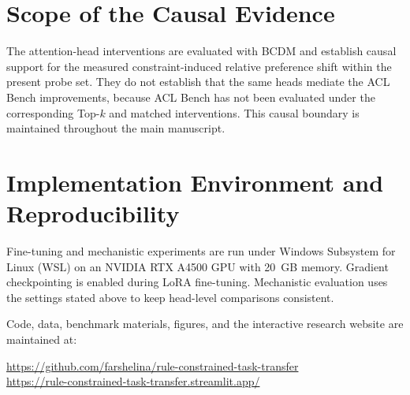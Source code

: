 \documentclass[11pt]{article}
\begin{document}
\section{Scope of the Causal Evidence}

The attention-head interventions are evaluated with BCDM and establish causal support for the measured constraint-induced relative preference shift within the present probe set. They do not establish that the same heads mediate the ACL Bench improvements, because ACL Bench has not been evaluated under the corresponding Top-$k$ and matched interventions. This causal boundary is maintained throughout the main manuscript.

\section{Implementation Environment and Reproducibility}

Fine-tuning and mechanistic experiments are run under Windows Subsystem for Linux (WSL) on an NVIDIA RTX A4500 GPU with 20~GB memory. Gradient checkpointing is enabled during LoRA fine-tuning. Mechanistic evaluation uses the settings stated above to keep head-level comparisons consistent.

Code, data, benchmark materials, figures, and the interactive research website are maintained at:
\begin{center}
\url{https://github.com/farshelina/rule-constrained-task-transfer}\\
\url{https://rule-constrained-task-transfer.streamlit.app/}
\end{center}
\end{document}
